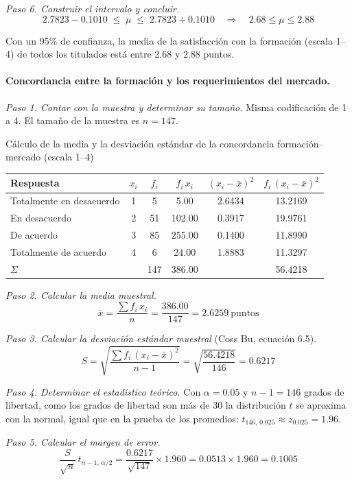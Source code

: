 \textit{Paso 6. Construir el intervalo y concluir.}
\[
2.7823 - 0.1010 \;\le\; \mu \;\le\; 2.7823 + 0.1010 \quad\Longrightarrow\quad 2.68 \le \mu \le 2.88
\]

Con un 95\% de confianza, la media de la satisfacción con la formación (escala 1--4) de todos los titulados está entre 2.68 y 2.88 puntos.

\paragraph{Concordancia entre la formación y los requerimientos del mercado.}

\textit{Paso 1. Contar con la muestra y determinar su tamaño.} Misma codificación de 1 a 4. El tamaño de la muestra es $n = 147$.

\begin{mitabla}{Cálculo de la media y la desviación estándar de la concordancia formación--mercado (escala 1--4)}
\begin{tabular}{lccccc}
\toprule
Respuesta & $x_i$ & $f_i$ & $f_i\,x_i$ & $(x_i-\bar{x})^2$ & $f_i\,(x_i-\bar{x})^2$ \\
\midrule
Totalmente en desacuerdo & 1 & 5 & 5.00 & 2.6434 & 13.2169 \\
En desacuerdo & 2 & 51 & 102.00 & 0.3917 & 19.9761 \\
De acuerdo & 3 & 85 & 255.00 & 0.1400 & 11.8990 \\
Totalmente de acuerdo & 4 & 6 & 24.00 & 1.8883 & 11.3297 \\
\midrule
$\Sigma$ & & 147 & 386.00 & & 56.4218 \\
\bottomrule
\end{tabular}
\end{mitabla}

\textit{Paso 2. Calcular la media muestral.}
\[
\bar{x} = \frac{\sum f_i\,x_i}{n} = \frac{386.00}{147} = 2.6259\ \text{puntos}
\]

\textit{Paso 3. Calcular la desviación estándar muestral} (Coss Bu, ecuación 6.5).
\[
S = \sqrt{\frac{\sum f_i\,(x_i-\bar{x})^2}{n-1}} = \sqrt{\frac{56.4218}{146}} = 0.6217
\]

\textit{Paso 4. Determinar el estadístico teórico.} Con $\alpha = 0.05$ y $n-1 = 146$ grados de libertad, como los grados de libertad son más de 30 la distribución $t$ se aproxima con la normal, igual que en la prueba de los promedios: $t_{146,\,0.025} \approx z_{0.025} = 1.96$.

\textit{Paso 5. Calcular el margen de error.}
\[
\frac{S}{\sqrt{n}}\,t_{n-1,\,\alpha/2} = \frac{0.6217}{\sqrt{147}}\times 1.960 = 0.0513 \times 1.960 = 0.1005
\]

